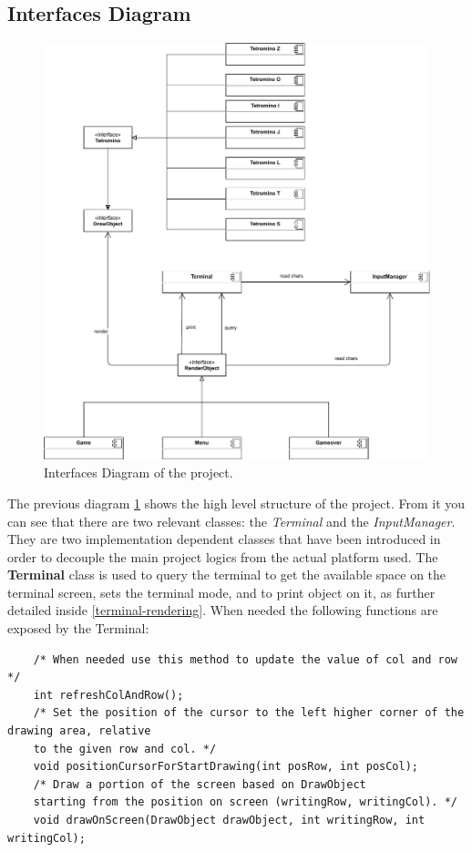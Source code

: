 \documentclass{article}
\begin{document}
\subsection{Interfaces Diagram}
\begin{figure}[H]
    \centering
    \includegraphics[width=\linewidth]{img/InterafcesDiagram.pdf}
    \caption{Interfaces Diagram of the project.}
    \label{fig:interface}
\end{figure}
The previous diagram \ref{fig:interface} shows the high level structure of the project. From it you can see that there are two relevant classes: the \textit{Terminal} and the \textit{InputManager}.
They are two implementation dependent classes that have been introduced in order to decouple the main project logics from the actual platform used.
The \textbf{Terminal} class is used to query the terminal to get the available space on the terminal screen, sets the terminal mode, and to print object on it, as further detailed inside \ref{terminal-rendering}.
When needed the following functions are exposed by the Terminal:
\begin{verbatim}
    /* When needed use this method to update the value of col and row */
    int refreshColAndRow();
    /* Set the position of the cursor to the left higher corner of the drawing area, relative
    to the given row and col. */
    void positionCursorForStartDrawing(int posRow, int posCol);
    /* Draw a portion of the screen based on DrawObject
    starting from the position on screen (writingRow, writingCol). */
    void drawOnScreen(DrawObject drawObject, int writingRow, int writingCol);
\end{verbatim}
\end{document}
